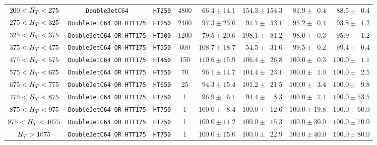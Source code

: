 \begin{table}[!ht]
\begin{tabular}{ ccccllll }
    \hline
    $200 < H_T < 275$  & \verb!DoubleJetC64!           & \verb!HT250! & 4800     & $\phantom{1}66.4 \pm 14.1$                & $154.3 \pm 154.3$                     & $\phantom{1}81.9 \pm \phantom{1}0.4$ & $\phantom{1}88.5 \pm \phantom{1}0.4$ \\
    $275 < H_T < 325$  & \verb!DoubleJetC64 OR HTT175! & \verb!HT250! & 2400     & $\phantom{1}97.3 \pm 23.0$                & $\phantom{1}91.7 \pm \phantom{1}53.1$ & $\phantom{1}95.2 \pm \phantom{1}0.4$ & $\phantom{1}93.8 \pm \phantom{1}1.2$ \\
    $325 < H_T < 375$  & \verb!DoubleJetC64 OR HTT175! & \verb!HT300! & 1200     & $\phantom{1}79.5 \pm 20.6$                & $198.1 \pm \phantom{1}81.2$           & $\phantom{1}98.0 \pm \phantom{1}0.3$ & $\phantom{1}95.9 \pm \phantom{1}1.2$ \\
    $375 < H_T < 475$  & \verb!DoubleJetC64 OR HTT175! & \verb!HT350! & 600      & $108.7 \pm 18.7$                          & $\phantom{1}54.5 \pm \phantom{1}31.6$ & $\phantom{1}99.5 \pm \phantom{1}0.2$ & $\phantom{1}99.4 \pm \phantom{1}0.4$ \\
    $475 < H_T < 575$  & \verb!DoubleJetC64 OR HTT175! & \verb!HT450! & 150      & $110.6 \pm 15.9$                          & $106.4 \pm \phantom{1}26.8$           & $100.0 \pm \phantom{1}0.3$ & $100.0 \pm \phantom{1}1.1$ \\
    $575 < H_T < 675$  & \verb!DoubleJetC64 OR HTT175! & \verb!HT550! & 70       & $\phantom{1}96.1 \pm 14.7$                & $104.4 \pm \phantom{1}23.1$           & $100.0 \pm \phantom{1}1.0$ & $100.0 \pm \phantom{1}2.5$ \\
    $675 < H_T < 775$  & \verb!DoubleJetC64 OR HTT175! & \verb!HT650! & 25       & $\phantom{1}94.3 \pm 15.4$                & $101.2 \pm \phantom{1}21.5$           & $100.0 \pm \phantom{1}3.4$ & $100.0 \pm \phantom{1}9.8$ \\
    $775 < H_T < 875$  & \verb!DoubleJetC64 OR HTT175! & \verb!HT750! & 1        & $\phantom{1}96.9 \pm \phantom{1}6.1$      & $\phantom{1}94.4 \pm \phantom{11}8.3$ & $100.0 \pm \phantom{1}7.1$ & $100.0 \pm 53.5$ \\
    $875 < H_T < 975$  & \verb!DoubleJetC64 OR HTT175! & \verb!HT750! & 1        & $100.0 \pm \phantom{1}8.4$                & $100.0 \pm \phantom{1}12.6$           & $100.0 \pm 19.8$ & $100.0 \pm 60.0$ \\
    $975 < H_T < 1075$ & \verb!DoubleJetC64 OR HTT175! & \verb!HT750! & 1        & $100.0 \pm 11.2$                          & $100.0 \pm \phantom{1}15.3$           & $100.0 \pm 30.0$ & $100.0 \pm 70.0$ \\
    $H_T > 1075$       & \verb!DoubleJetC64 OR HTT175! & \verb!HT750! & 1        & $100.0 \pm 15.0$                          & $100.0 \pm \phantom{1}22.9$           & $100.0 \pm 40.0$ & $100.0 \pm 80.0$ \\
    \hline
    \hline
  \end{tabular}
\end{table}

